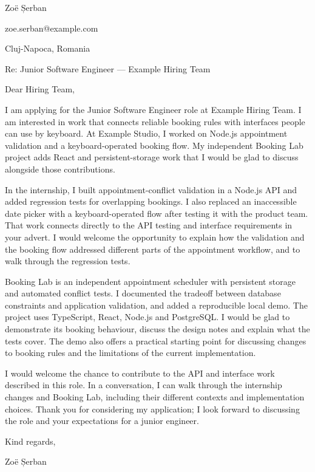 \documentclass[11pt,a4paper]{article}
\begin{document}
Zoë Șerban\par

zoe.serban@example.com\par

Cluj-Napoca, Romania\par

Re: Junior Software Engineer — Example Hiring Team\par

Dear Hiring Team,\par

I am applying for the Junior Software Engineer role at Example Hiring Team. I am interested in work that connects reliable booking rules with interfaces people can use by keyboard. At Example Studio, I worked on Node.js appointment validation and a keyboard-operated booking flow. My independent Booking Lab project adds React and persistent-storage work that I would be glad to discuss alongside those contributions.\par

In the internship, I built appointment-conflict validation in a Node.js API and added regression tests for overlapping bookings. I also replaced an inaccessible date picker with a keyboard-operated flow after testing it with the product team. That work connects directly to the API testing and interface requirements in your advert. I would welcome the opportunity to explain how the validation and the booking flow addressed different parts of the appointment workflow, and to walk through the regression tests.\par

Booking Lab is an independent appointment scheduler with persistent storage and automated conflict tests. I documented the tradeoff between database constraints and application validation, and added a reproducible local demo. The project uses TypeScript, React, Node.js and PostgreSQL. I would be glad to demonstrate its booking behaviour, discuss the design notes and explain what the tests cover. The demo also offers a practical starting point for discussing changes to booking rules and the limitations of the current implementation.\par

I would welcome the chance to contribute to the API and interface work described in this role. In a conversation, I can walk through the internship changes and Booking Lab, including their different contexts and implementation choices. Thank you for considering my application; I look forward to discussing the role and your expectations for a junior engineer.\par

Kind regards,\par

Zoë Șerban
\par
\end{document}
